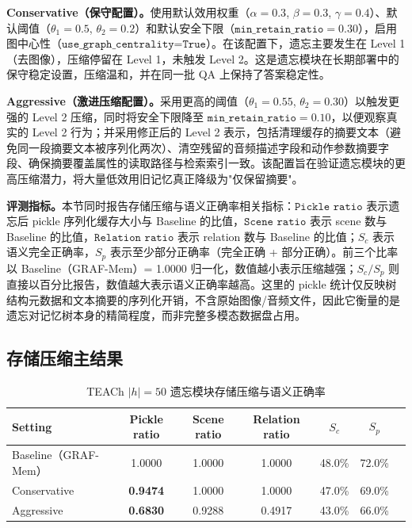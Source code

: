 \textbf{Conservative（保守配置）。}使用默认效用权重（$\alpha=0.3$, $\beta=0.3$, $\gamma=0.4$）、默认阈值（$\theta_1=0.5$, $\theta_2=0.2$）和默认安全下限（$\texttt{min\_retain\_ratio}=0.30$），启用图中心性（$\texttt{use\_graph\_centrality=True}$）。在该配置下，遗忘主要发生在 Level 1（去图像），压缩停留在 Level 1，未触发 Level 2。这是遗忘模块在长期部署中的保守稳定设置，压缩温和，并在同一批 QA 上保持了答案稳定性。

\textbf{Aggressive（激进压缩配置）。}采用更高的阈值（$\theta_1=0.55$, $\theta_2=0.30$）以触发更强的 Level 2 压缩，同时将安全下限降至 $\texttt{min\_retain\_ratio}=0.10$，以便观察真实的 Level 2 行为；并采用修正后的 Level 2 表示，包括清理缓存的摘要文本（避免同一段摘要文本被序列化两次）、清空残留的音频描述字段和动作参数摘要字段、确保摘要覆盖属性的读取路径与检索索引一致。该配置旨在验证遗忘模块的更高压缩潜力，将大量低效用旧记忆真正降级为"仅保留摘要"。

\textbf{评测指标。}本节同时报告存储压缩与语义正确率相关指标：$\texttt{Pickle ratio}$ 表示遗忘后 pickle 序列化缓存大小与 Baseline 的比值，$\texttt{Scene ratio}$ 表示 scene 数与 Baseline 的比值，$\texttt{Relation ratio}$ 表示 relation 数与 Baseline 的比值；$S_c$ 表示语义完全正确率，$S_p$ 表示至少部分正确率（完全正确 + 部分正确）。前三个比率以 Baseline（GRAF-Mem）= 1.0000 归一化，数值越小表示压缩越强；$S_c/S_p$ 则直接以百分比报告，数值越大表示语义正确率越高。这里的 pickle 统计仅反映树结构元数据和文本摘要的序列化开销，不含原始图像/音频文件，因此它衡量的是遗忘对记忆树本身的精简程度，而非完整多模态数据盘占用。

\subsection{存储压缩主结果}

\begin{table}[htbp]
\centering
\caption{TEACh $|h|=50$ 遗忘模块存储压缩与语义正确率}
\label{tab:4-2}
\begin{tabular}{lcccccc}
\toprule
Setting & Pickle ratio & Scene ratio & Relation ratio & $S_c$ & $S_p$ \\
\midrule
Baseline（GRAF-Mem） & 1.0000 & 1.0000 & 1.0000 & 48.0\% & 72.0\% \\
Conservative & \textbf{0.9474} & 1.0000 & 1.0000 & 47.0\% & 69.0\% \\
Aggressive & \textbf{0.6830} & 0.9288 & 0.4917 & 43.0\% & 66.0\% \\
\bottomrule
\end{tabular}
\end{table}

